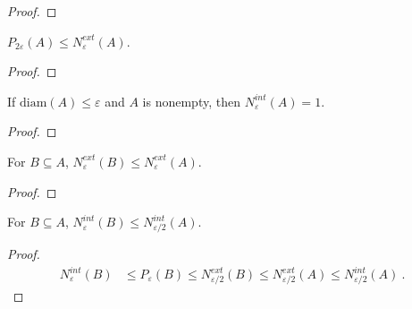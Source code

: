 \begin{proof}\leanok

\end{proof}


\begin{lemma}\label{lem:packingNumber_two_le_externalCoveringNumber}
  \leanok
$P_{2\varepsilon}(A) \le N^{ext}_\varepsilon(A)$.
\end{lemma}

\begin{proof}\leanok

\end{proof}


\begin{lemma}\label{lem:internalCoveringNumber_eq_one_of_diam_le}
  \leanok
If $\mathrm{diam}(A) \le \varepsilon$ and $A$ is nonempty, then $N^{int}_\varepsilon(A) = 1$.
\end{lemma}

\begin{proof}\leanok

\end{proof}


\begin{lemma}\label{lem:externalCoveringNumber_mono}
  \leanok
For $B \subseteq A$, $N^{ext}_\varepsilon(B) \le N^{ext}_{\varepsilon}(A)$.
\end{lemma}

\begin{proof}\leanok

\end{proof}


\begin{lemma}\label{lem:internalCoveringNumber_subset_le}
  \leanok
For $B \subseteq A$, $N^{int}_\varepsilon(B) \le N^{int}_{\varepsilon/2}(A)$.
\end{lemma}

\begin{proof}\leanok
\begin{align*}
  N^{int}_\varepsilon(B)
  &\le P_{\varepsilon}(B)
  \le N^{ext}_{\varepsilon/2}(B)
  \le N^{ext}_{\varepsilon/2}(A)
  \le N^{int}_{\varepsilon/2}(A)
  \: .
\end{align*}
\end{proof}


